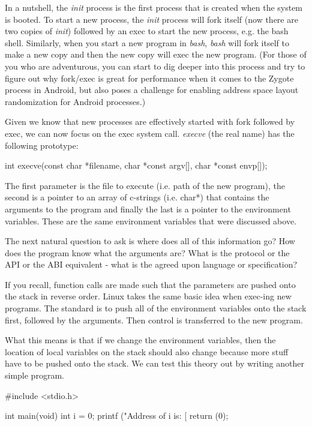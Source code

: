 In a nutshell, the {\em init} process is the first process that is created when the system is booted. To start a new process, the {\em init} process will fork itself (now there are two copies of {\em init}) followed by an exec to start the new process, e.g. the bash shell. Similarly, when you start a new program in {\em bash}, {\em bash} will fork itself to make a new copy and then the new copy will exec the new program. (For those of you who are adventurous, you can start to dig deeper into this process and try to figure out why fork/exec is great for performance when it comes to the Zygote process in Android, but also poses a challenge for enabling address space layout randomization for Android processes.)

Given we know that new processes are effectively started with fork followed by exec, we can now focus on the exec system call. {\em execve} (the real name) has the following prototype:

\begin{code}
int execve(const char *filename, char *const argv[], char *const envp[]);
\end{code}

The first parameter is the file to execute (i.e. path of the new program), the second is a pointer to an array of c-strings (i.e. char*) that contains the arguments to the program and finally the last is a pointer to the environment variables. These are the same environment variables that were discussed above.

The next natural question to ask is where does all of this information go? How does the program know what the arguments are? What is the protocol or the API or the ABI equivalent - what is the agreed upon language or specification?

If you recall, function calls are made such that the parameters are pushed onto the stack in reverse order. Linux takes the same basic idea when exec-ing new programs. The standard is to push all of the environment variables onto the stack first, followed by the arguments. Then control is transferred to the new program.

What this means is that if we change the environment variables, then the location of local variables on the stack should also change because more stuff have to be pushed onto the stack. We can test this theory out by writing another simple program. 

\begin{code}
#include <stdio.h>

int main(void)
{
  int i = 0;
  printf ("Address of i is: [%
  return (0);
}
\end{code}

